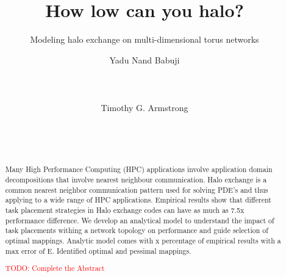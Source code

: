 \documentclass{acm_proc_article-sp}
\begin{document}
\setlength{\pdfpageheight}{\paperheight}
\setlength{\pdfpagewidth}{\paperwidth}


\newcommand{\timnote}[1]{ {\textcolor{maroon} { Tim: #1 }}}
\newcommand{\todo}[1]{ {\textcolor{red} { TODO: #1 }}}

\title{How low can you halo?}
\subtitle{Modeling halo exchange on multi-dimensional torus networks}


\author{
\alignauthor
Yadu Nand Babuji\\
       \\
       \\
       \\
\alignauthor
Timothy G. Armstrong\\
       \\
       \\
       \\
}
\maketitle

\begin{abstract}
Many High Performance Computing (HPC) applications involve application domain decompositions that involve nearest neighbour communication.
Halo exchange is a common nearest neighbor communication pattern used for solving PDE's and thus applying to a wide range of HPC applications.
Empirical results show that different task placement strategies in Halo exchange codes can have as much as 7.5x performance difference.
We develop an analytical model to understand the impact of task placements withing a network topology on performance and guide selection of
optimal mappings.
Analytic model comes with x percentage of empirical results with a max error of E.
Identified optimal and pessimal mappings.

\todo{Complete the Abstract}

\end{abstract}
\end{document}
